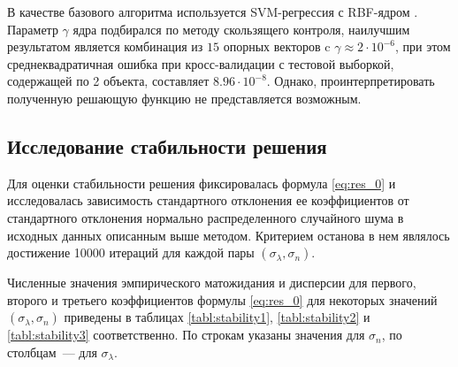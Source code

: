 \documentclass[12pt,a4paper]{article}
\begin{document}
В качестве базового алгоритма используется SVM-регрессия с RBF-ядром \cite{Vapnik79}.
Параметр $\gamma$ ядра подбирался по методу скользящего контроля, наилучшим результатом является
комбинация из $15$ опорных векторов c $\gamma \approx 2 \cdot 10^{-6}$, при этом
среднеквадратичная ошибка при кросс-валидации с тестовой выборкой, содержащей по 2
объекта, составляет $8.96 \cdot 10^{-8}$. Однако, проинтерпретировать полученную
решающую функцию не представляется возможным.

\subsection{Исследование стабильности решения}

Для оценки стабильности решения фиксировалась формула \eqref{eq:res_0} и исследовалась
зависимость стандартного отклонения ее коэффициентов от стандартного отклонения
нормально распределенного случайного шума в исходных данных описанным выше методом.
Критерием останова в нем являлось достижение 10000 итераций для каждой пары
$(\sigma_{\lambda}, \sigma_n)$.

Численные значения эмпирического матожидания и дисперсии для первого, второго и третьего
коэффициентов формулы \eqref{eq:res_0} для некоторых значений
$(\sigma_{\lambda}, \sigma_n)$ приведены в таблицах \ref{tabl:stability1},
\ref{tabl:stability2} и \ref{tabl:stability3} соответственно. По строкам указаны значения
для $\sigma_n$, по столбцам~--- для $\sigma_{\lambda}$.
\end{document}
